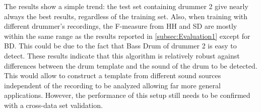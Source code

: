 \documentclass{article}
\begin{document}


The results show a simple trend: the test set containing drummer 2 give nearly always the best results, regardless of the training set. Also, when training with different drummer's recordings, the F-measure from HH and SD are mostly within the same range as the results reported in \ref{subsec:Evaluation1} except for BD. This could be due to the fact that Bass Drum of drummer 2 is easy to detect.
These results indicate that this algorithm is relatively robust against differences between the drum template and the sound of the drum to be detected. This would allow to construct a template from different sound sources independent of the recording to be analyzed allowing far more general applications. However, the performance of this setup still needs to be confirmed with a cross-data set validation.
\end{document}

